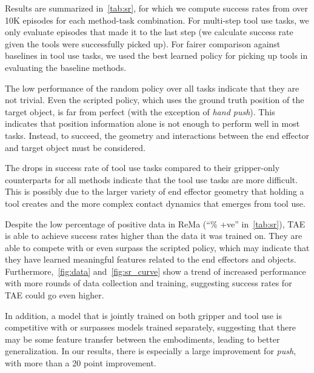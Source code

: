 \documentclass[10pt,twocolumn,letterpaper]{article}
\begin{document}
Results are summarized in~\cref{tab:sr}, for which we compute success rates from over 10K episodes for each method-task combination. For multi-step tool use tasks, we only evaluate episodes that made it to the last step (\ie we calculate success rate given the tools were successfully picked up). For fairer comparison against baselines in tool use tasks, we used the best learned policy for picking up tools in evaluating the baseline methods.

The low performance of the random policy over all tasks indicate that they are not trivial. Even the scripted policy, which uses the ground truth position of the target object, is far from perfect (with the exception of \emph{hand push}). This indicates that position information alone is not enough to perform well in most tasks. Instead, to succeed, the geometry and interactions between the end effector and target object must be considered.

The drops in success rate of tool use tasks compared to their gripper-only counterparts for all methods indicate that the tool use tasks are more difficult. This is possibly due to the larger variety of end effector geometry that holding a tool creates and the more complex contact dynamics that emerges from tool use.

Despite the low percentage of positive data in ReMa (``\% +ve'' in~\cref{tab:sr}), TAE is able to achieve success rates higher than the data it was trained on. They are able to compete with or even surpass the scripted policy, which may indicate that they have learned meaningful features related to the end effectors and objects. Furthermore,~\cref{fig:data} and~\cref{fig:sr_curve} show a trend of increased performance with more rounds of data collection and training, suggesting success rates for TAE could go even higher.

In addition, a model that is jointly trained on both gripper and tool use is competitive with or surpasses models trained separately, suggesting that there may be some feature transfer between the embodiments, leading to better generalization. In our results, there is especially a large improvement for \emph{push}, with more than a 20 point improvement.
\end{document}
